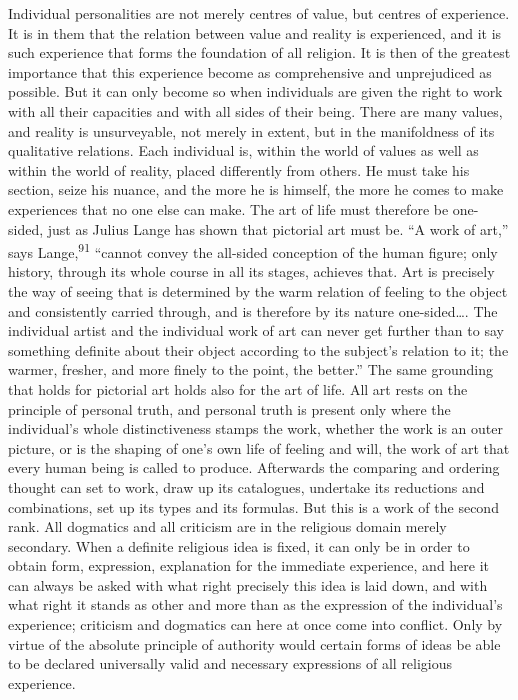 \documentclass[12pt,a4paper]{book}
\newcommand{\opage}[1]{\marginnote{\footnotesize\textit{[#1]}}}
\begin{document}
Individual personalities are not merely centres of value, but centres of experience. It is in them that
the relation between value and reality is experienced, and it is such experience that forms the
foundation of all religion. It is then of the greatest importance that 
\opage{192}this experience become as
comprehensive and unprejudiced as possible. But it can only become so when individuals are given the
right to work with all their capacities and with all sides of their being. There are many values, and
reality is unsurveyable, not merely in extent, but in the manifoldness of its qualitative relations.
Each individual is, within the world of values as well as within the world of reality, placed
differently from others. He must take his section, seize his nuance, and the more he is himself, the
more he comes to make experiences that no one else can make. The art of life must therefore be
one-sided, just as Julius Lange has shown that pictorial art must be. ``A work of art,''
says Lange,\textsuperscript{91} ``cannot convey the all-sided conception of the human figure; only
history, through its whole course in all its stages, achieves that. Art is precisely the way of seeing
that is determined by the warm relation of feeling to the object and consistently carried through, and
is therefore by its nature one-sided\ldots. The individual artist and the individual work of art can
never get further than to say something definite about their object according to the subject's relation
to it; the warmer, fresher, and more finely to the point, the better.'' The same grounding that holds
for pictorial art holds also for the art of life. All art rests on the principle of personal truth, and
personal truth is present only where the individual's whole distinctiveness stamps the work, whether the
work is an outer picture, or is the shaping of one's own life of feeling and will, the work of art that
every human being is called to produce. Afterwards the comparing and ordering thought can set to work,
draw up its catalogues, undertake its reductions and combinations, set up its types and its formulas. But
this is a work of the second rank. All dogmatics and all criticism are in the religious domain merely
secondary. When a definite religious idea is fixed, it can only be in order to obtain form, expression,
explanation for the immediate experience, and here it can always be asked with what right precisely this
idea is laid down, and with what right it stands as other and more than as the expression of the
individual's experience; criticism and dogmatics can here at once come into conflict. Only by virtue of
the absolute principle of authority would certain forms of ideas be able to be declared universally valid
and necessary expressions of all religious experience.
\end{document}
